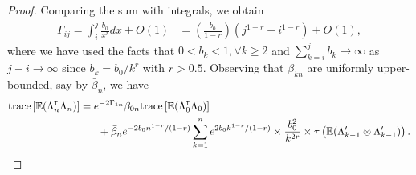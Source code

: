 \begin{proof}
Comparing the sum with integrals, we obtain
\begin{align*}
\Gamma_{ij} = \int_i^j \frac{b_0}{x^r} dx + O(1) &= \left(\frac{b_0}{1-r}\right)(j^{1-r}-i^{1-r}) +O(1),
\end{align*}
where we have used the facts that $0 < b_k < 1, \forall k \ge 2$ and 
$\sum_{k=i}^j b_k \to \infty$ as $j-i \to \infty$ since 
$b_k = b_0/k^r$ with $r > 0.5$.
Observing that $\beta_{kn}$ are uniformly upper-bounded, say by $\bar \beta_n$, we have
\begin{align}\label{eq:thmwts}
 & \text{trace} \left[\E (\Lambda_n \tr \Lambda_n)\right] =  e^{-2 \Gamma_{1n}} \beta_{0n} \text{trace} \left[\E (\Lambda_0 \tr \Lambda_0)\right]  \nonumber\\ 
&\hspace{3cm}+ \bar \beta_n e^{-2 b_0 n^{1-r}/(1-r)} \sum_{k=1}^n e^{2 b_0 k^{1-r}/(1-r)}  \times \frac{b_0^2}{k^{2 r}}  \times \tau\left(\E (\Lambda_{k-1}' \otimes \Lambda_{k-1}')\right).
\end{align} 
%

\end{proof}
